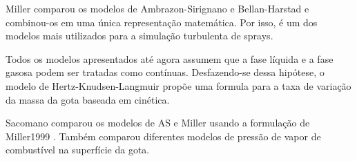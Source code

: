 Miller  comparou os modelos de Ambrazon-Sirignano e Bellan-Harstad e combinou-os em uma única representação matemática.
Por isso, é um dos modelos mais utilizados para a simulação turbulenta de sprays.  

Todos os modelos apresentados até agora assumem que a fase líquida e a fase gasosa podem ser tratadas como contínuas.
Desfazendo-se dessa hipótese, o modelo de Hertz-Knudsen-Langmuir  propõe uma formula para a taxa de variação da massa da gota baseada em cinética.



Sacomano  comparou os modelos de AS e Miller usando a formulação de Miller1999 . 
Também comparou diferentes modelos de pressão de vapor de combustível na superfície da gota.


